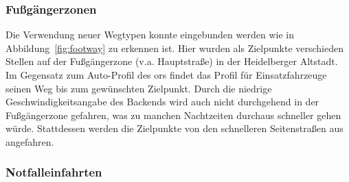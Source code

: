 \subsubsection{Fußgängerzonen}

Die Verwendung neuer Wegtypen konnte eingebunden werden wie in Abbildung~\ref{fig:footway} zu erkennen ist.
Hier wurden als Zielpunkte verschieden Stellen auf der Fußgängerzone (v.a. Hauptstraße) in der Heidelberger Altstadt.
Im Gegensatz zum Auto-Profil des \gls{ors} findet das Profil für Einsatzfahrzeuge seinen Weg bis zum gewünschten Zielpunkt.
Durch die niedrige Geschwindigkeitsangabe des Backends wird auch nicht durchgehend in der Fußgängerzone gefahren, was zu manchen Nachtzeiten durchaus schneller gehen würde.
Stattdessen werden die Zielpunkte von den schnelleren Seitenstraßen aus angefahren.


\subsubsection{Notfalleinfahrten}

